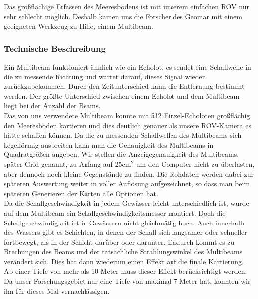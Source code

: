  

Das großflächige Erfassen des Meeresbodens ist mit unserem einfachen ROV nur sehr schlecht möglich. Deshalb kamen uns die Forscher des Geomar mit einem geeigneten Werkzeug zu Hilfe, einem \glqq Multibeam\grqq . \\

\subsubsection{Technische Beschreibung}
Ein Multibeam funktioniert ähnlich wie ein Echolot, es sendet eine Schallwelle in die zu messende 
Richtung und wartet darauf, dieses Signal wieder zurückzubekommen. Durch den Zeitunterschied 
kann die Entfernung bestimmt werden. Der größte Unterschied zwischen einem Echolot und dem Multibeam 
liegt bei der Anzahl der Beams. \\

Das von uns verwendete Multibeam konnte mit 512 Einzel-Echoloten großflächig den Meeresboden kartieren und dies 
deutlich genauer als unsere ROV-Kamera es hätte schaffen können. Da die zu messenden Schallwellen des Multibeams 
sich kegelförmig ausbreiten kann man die Genauigkeit des Multibeams in Quadratgrößen angeben. 
Wir stellen die Anzeigegenauigkeit des Multibeams, später Grid genannt, zu Anfang auf 25cm$^2$ um den Computer nicht zu überlasten, aber 
dennoch noch kleine Gegenstände zu finden. Die Rohdaten werden dabei zur späteren Auswertung weiter in voller Auflösung aufgezeichnet, so dass man beim späteren Generieren der Karten alle Optionen hat.\\

Da die Schallgeschwindigkeit in jedem Gewässer leicht unterschiedlich ist, wurde auf dem Multibeam
ein Schallgeschwindigkeitsmesser montiert. Doch die Schallgeschwindigkeit ist in Gewässern nicht gleichmäßig hoch.
Auch innerhalb des Wassers gibt es Schichten, in denen der Schall sich langsamer oder schneller fortbewegt, als in
der Schicht darüber oder darunter. Dadurch kommt es zu Brechungen des Beams und der tatsächliche 
Strahlungswinkel des Multibeams verändert sich. Dies hat dann wiederum einen Effekt auf die finale Kartierung.
Ab einer Tiefe von mehr als 10 Meter muss dieser Effekt berücksichtigt werden. Da unser Forschungsgebiet nur eine 
Tiefe von maximal 7 Meter hat, konnten wir ihn für dieses Mal vernachlässigen.\\

